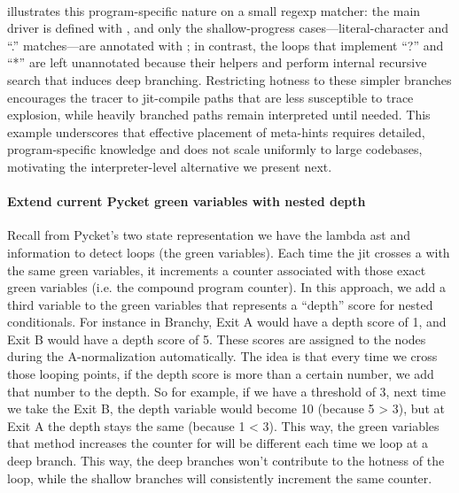     \paragraph{}%
       illustrates this program-specific nature on a small regexp matcher: the main driver  is defined with , and only the shallow-progress cases—literal-character and “.” matches—are annotated with ; in contrast, the loops that implement “?” and “*” are left unannotated because their helpers  and  perform internal recursive search that induces deep branching. Restricting hotness to these simpler branches encourages the tracer to \gls{jit}-compile paths that are less susceptible to trace explosion, while heavily branched paths remain interpreted until needed. This example underscores that effective placement of meta-hints requires detailed, program-specific knowledge and does not scale uniformly to large codebases, motivating the interpreter-level alternative we present next.

    \paragraph{Extend current Pycket green variables with nested  depth}%
      Recall from Pycket's two state representation we have the lambda \gls{ast} and  information to detect loops (the green variables). Each time the \gls{jit} crosses a  with the same green variables, it increments a counter associated with those exact green variables (i.e. the compound program counter). In this approach, we add a third variable to the green variables that represents a “depth” score for nested conditionals. For instance in Branchy, Exit A would have a depth score of 1, and Exit B would have a depth score of 5. These scores are assigned to the  nodes during the A-normalization automatically. The idea is that every time we cross those looping points, if the depth score is more than a certain number, we add that number to the depth. So for example, if we have a threshold of 3, next time we take the Exit B, the depth variable would become 10 (because 5 > 3), but at Exit A the depth stays the same (because 1 < 3). This way, the green variables that  method increases the counter for will be different each time we loop at a deep branch. This way, the deep branches won't contribute to the hotness of the loop, while the shallow branches will consistently increment the same counter.

